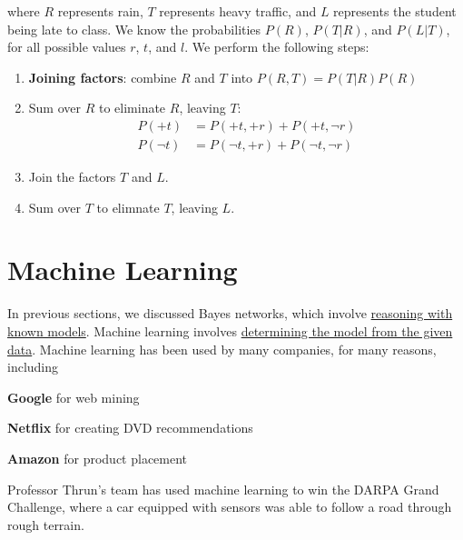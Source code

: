 \documentclass[10pt,a4paper]{article}
\newenvironment{itemize_packed}{
\begin{itemize}
\setlength{\itemsep}{0pt}
\setlength{\parskip}{0pt}
}{\end{itemize}}
\begin{document}
\noindent where $R$ represents rain, $T$ represents heavy traffic, and $L$ represents the student being late to class. We know the probabilities $P(R)$, $P(T|R)$, and $P(L|T)$, for all possible values $r$, $t$, and $l$. We perform the following steps:

\begin{enumerate}
\item \textbf{Joining factors}: combine $R$ and $T$ into $P(R,T) = P(T|R)P(R)$
\item Sum over $R$ to eliminate $R$, leaving $T$:
\begin{align*}
P(+t) & = P(+t,+r) + P(+t,\neg r) \\
P(\neg t) & = P(\neg t,+r) + P(\neg t, \neg r)
\end{align*}
\item Join the factors $T$ and $L$.
\item Sum over $T$ to elimnate $T$, leaving $L$.
\end{enumerate}


\part{Machine Learning}

In previous sections, we discussed Bayes networks, which involve \underline{reasoning with known models}. Machine learning involves \underline{determining the model from the given data}. Machine learning has been used by many companies, for many reasons, including
\begin{itemize_packed}
\item \textbf{Google} for web mining
\item \textbf{Netflix} for creating DVD recommendations
\item \textbf{Amazon} for product placement
\end{itemize_packed}

\noindent Professor Thrun's team has used machine learning to win the DARPA Grand Challenge, where a car equipped with sensors was able to follow a road through rough terrain.
\end{document}
